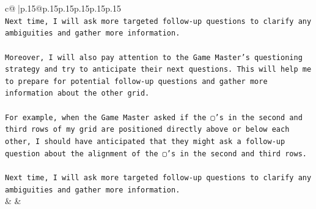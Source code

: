 \documentclass{article}
\begin{document}
{\begin{supertabular}{c@{$\;$}|p{.15\linewidth}@{}p{.15\linewidth}p{.15\linewidth}p{.15\linewidth}p{.15\linewidth}p{.15\linewidth}}
{{{\\ 
\texttt{Next time, I will ask more targeted follow{-}up questions to clarify any ambiguities and gather more information. } \\
\\ 
\texttt{Moreover, I will also pay attention to the Game Master's questioning strategy and try to anticipate their next questions. This will help me to prepare for potential follow{-}up questions and gather more information about the other grid. } \\
\\ 
\texttt{For example, when the Game Master asked if the ▢'s in the second and third rows of my grid are positioned directly above or below each other, I should have anticipated that they might ask a follow{-}up question about the alignment of the ▢'s in the second and third rows. } \\
\\ 
\texttt{Next time, I will ask more targeted follow{-}up questions to clarify any ambiguities and gather more information.} \\
            }
        }
    }
    & & \\ \\


\end{supertabular}}
\end{document}
